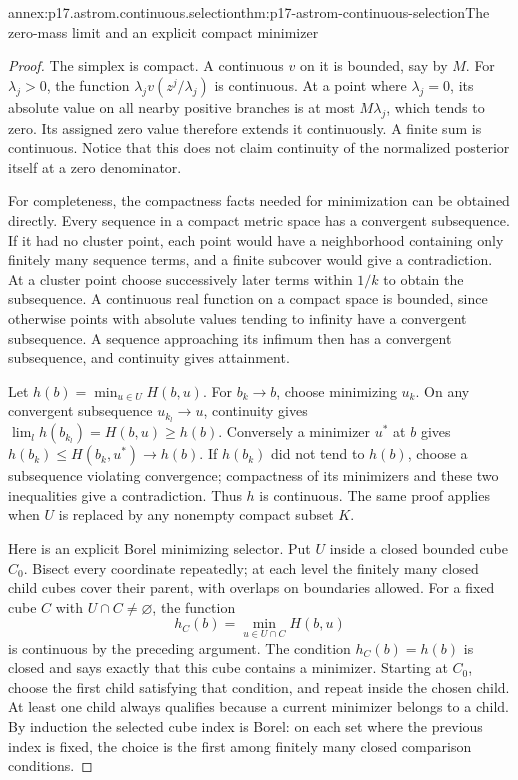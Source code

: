 \begin{annexitem}{annex:p17.astrom.continuous.selection}{thm:p17-astrom-continuous-selection}{The zero-mass limit and an explicit compact minimizer}
\begin{proof}
The simplex is compact. A continuous \(v\) on it is
bounded, say by \(M\). For \(\lambda_j>0\), the function
\(\lambda_j v(z^j/\lambda_j)\) is continuous.
At a point where \(\lambda_j=0\), its absolute value
on all nearby positive branches is at most \(M\lambda_j\),
which tends to zero. Its assigned zero value therefore
extends it continuously. A finite sum is continuous.
Notice that this does not claim continuity of the
normalized posterior itself at a zero denominator.

For completeness, the compactness facts needed for
minimization can be obtained directly. Every sequence
in a compact metric space has a convergent subsequence.
If it had no cluster point, each point would have a
neighborhood containing only finitely many sequence terms,
and a finite subcover would give a contradiction.
At a cluster point choose successively later terms
within \(1/k\) to obtain the subsequence.
A continuous real function on a compact space is
bounded, since otherwise points with absolute values
tending to infinity have a convergent subsequence.
A sequence approaching its infimum then has a convergent
subsequence, and continuity gives attainment.

Let \(h(b)=\min_{u\in U}H(b,u)\).
For \(b_k\to b\), choose minimizing \(u_k\).
On any convergent subsequence \(u_{k_l}\to u\),
continuity gives
\(\lim_l h(b_{k_l})=H(b,u)\geq h(b)\).
Conversely a minimizer \(u^*\) at \(b\) gives
\(h(b_k)\leq H(b_k,u^*)\to h(b)\).
If \(h(b_k)\) did not tend to \(h(b)\), choose a
subsequence violating convergence; compactness of its
minimizers and these two inequalities give a contradiction.
Thus \(h\) is continuous. The same proof applies when
\(U\) is replaced by any nonempty compact subset \(K\).

Here is an explicit Borel minimizing selector.
Put \(U\) inside a closed bounded cube \(C_0\).
Bisect every coordinate repeatedly; at each level the
finitely many closed child cubes cover their parent,
with overlaps on boundaries allowed. For a fixed
cube \(C\) with \(U\cap C\ne\varnothing\), the function
\[
              h_C(b)=\min_{u\in U\cap C}H(b,u)
\]
is continuous by the preceding argument.
The condition \(h_C(b)=h(b)\) is closed and says
exactly that this cube contains a minimizer.
Starting at \(C_0\), choose the first child satisfying
that condition, and repeat inside the chosen child.
At least one child always qualifies because a current
minimizer belongs to a child. By induction the selected
cube index is Borel: on each set where the previous
index is fixed, the choice is the first among finitely
many closed comparison conditions.


\end{proof}
\end{annexitem}
